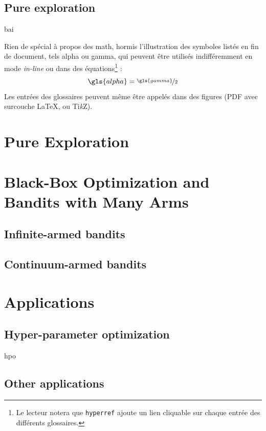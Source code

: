 	\subsection{Pure exploration}\label{sec:intro.context.pure}
	\gls{bai}
	
	Rien de spécial à propos des math, hormis l'illustration des symboles listés en fin de document, tels \gls{alpha} ou \gls{gamma}, qui peuvent être utilisés indifféremment en mode \emph{in-line} ou dans des équations\footnote{Le lecteur notera que \texttt{hyperref} ajoute un lien cliquable sur chaque entrée des différents glossaires.} :
	\begin{equation}
		\gls{alpha}=\nicefrac{\gls{gamma}}{2}
		\label{eq:alphagamma}
	\end{equation}
Les entrées des glossaires peuvent même être appelés dans des figures (PDF avec surcouche \LaTeX, ou Ti\textit{k}Z).

\section{Pure Exploration}\label{sec:intro.pe}
    
\section{Black-Box Optimization and Bandits with Many Arms}\label{sec:intro.black}
    \subsection{Infinite-armed bandits}\label{sec:intro.black.infinite}
    
    \subsection{Continuum-armed bandits}\label{sec:intro.black.continuum}
    
\section{Applications}\label{sec:intro.application}
    \subsection{Hyper-parameter optimization}\label{intro.application.hpo}
    \gls{hpo}
    
    \subsection{Other applications}\label{intro.application.other}
    
